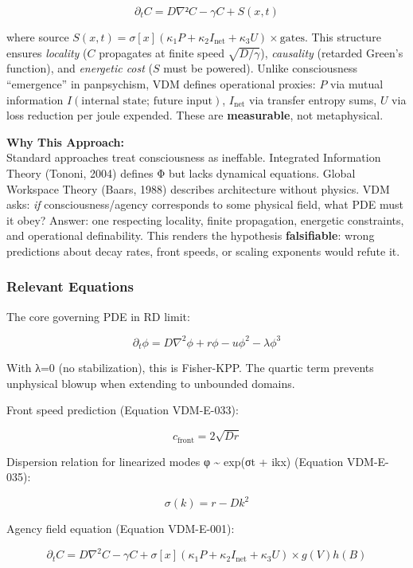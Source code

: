 \documentclass[
]{article}
\begin{document}
\[\partial_t C = D\nabla²C - \gamma C + S(x,t)\]

where source
\(S(x,t) = \sigma[x](\kappa_{1} P + \kappa_{2} I_{\text{net}} + \kappa_{3} U) \times \text{gates}\).
This structure ensures \emph{locality} (\(C\) propagates at finite speed
\(\sqrt{D/\gamma}\)), \emph{causality} (retarded Green's function), and
\emph{energetic cost} (\(S\) must be powered). Unlike consciousness
``emergence'' in panpsychism, VDM defines operational proxies: \(P\) via
mutual information \(I(\text{internal state};\, \text{future input})\),
\(I_{\text{net}}\) via transfer entropy sums, \(U\) via loss reduction
per joule expended. These are \textbf{measurable}, not metaphysical.

\textbf{Why This Approach:}\\
Standard approaches treat consciousness as ineffable. Integrated
Information Theory (Tononi, 2004) defines Φ but lacks dynamical
equations. Global Workspace Theory (Baars, 1988) describes architecture
without physics. VDM asks: \emph{if} consciousness/agency corresponds to
some physical field, what PDE must it obey? Answer: one respecting
locality, finite propagation, energetic constraints, and operational
definability. This renders the hypothesis \textbf{falsifiable}: wrong
predictions about decay rates, front speeds, or scaling exponents would
refute it.

\hypertarget{relevant-equations}{%
\subsubsection{Relevant Equations}\label{relevant-equations}}

The core governing PDE in RD limit:

\[\partial_t \phi = D\nabla^2\phi + r\phi - u\phi^2 - \lambda\phi^3\]

With λ=0 (no stabilization), this is Fisher-KPP. The quartic term
prevents unphysical blowup when extending to unbounded domains.

Front speed prediction (Equation VDM-E-033):

\[c_{\text{front}} = 2\sqrt{Dr}\]

Dispersion relation for linearized modes φ \textasciitilde{} exp(σt +
ikx) (Equation VDM-E-035):

\[\sigma(k) = r - Dk^2\]

Agency field equation (Equation VDM-E-001):

\[\partial_t C = D\nabla^2 C - \gamma C + \sigma[x](\kappa_1 P + \kappa_2 I_{\text{net}} + \kappa_3 U) \times g(V)h(B)\]
\end{document}
